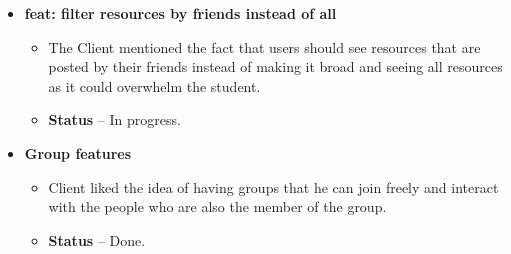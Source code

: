 \begin{itemize}
    \item \textbf{feat: filter resources by friends instead of all} 
    \begin{itemize}
        \item The Client mentioned the fact that users should see resources that are posted by their friends instead of making it broad and seeing all resources as it could overwhelm the student.
        \item \textbf{Status} -- In progress.
    \end{itemize}
    
    \item \textbf{Group features} 
    \begin{itemize}
        \item Client liked the idea of having groups that he can join freely and interact with the people who are also the member of the group.
        \item \textbf{Status} -- Done.
    \end{itemize}
    
\end{itemize}
